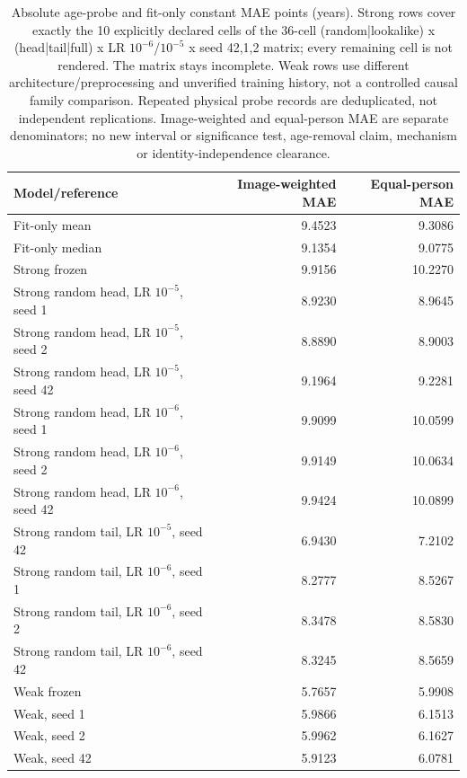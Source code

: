 \begin{table}[!t]
\caption{Absolute age-probe and fit-only constant MAE points (years). Strong rows cover exactly the 10 explicitly declared cells of the 36-cell (random|lookalike) x (head|tail|full) x LR $10^{-6}$/$10^{-5}$ x seed {42,1,2} matrix; every remaining cell is not rendered. The matrix stays incomplete. Weak rows use different architecture/preprocessing and unverified training history, not a controlled causal family comparison. Repeated physical probe records are deduplicated, not independent replications. Image-weighted and equal-person MAE are separate denominators; no new interval or significance test, age-removal claim, mechanism or identity-independence clearance.}
\label{tab:age-probe-absolute-points}
\centering\scriptsize
\begin{tabular}{@{}lrr@{}}
\toprule
Model/reference & Image-weighted MAE & Equal-person MAE \\
\midrule
Fit-only mean & 9.4523 & 9.3086 \\
Fit-only median & 9.1354 & 9.0775 \\
Strong frozen & 9.9156 & 10.2270 \\
Strong random head, LR $10^{-5}$, seed 1 & 8.9230 & 8.9645 \\
Strong random head, LR $10^{-5}$, seed 2 & 8.8890 & 8.9003 \\
Strong random head, LR $10^{-5}$, seed 42 & 9.1964 & 9.2281 \\
Strong random head, LR $10^{-6}$, seed 1 & 9.9099 & 10.0599 \\
Strong random head, LR $10^{-6}$, seed 2 & 9.9149 & 10.0634 \\
Strong random head, LR $10^{-6}$, seed 42 & 9.9424 & 10.0899 \\
Strong random tail, LR $10^{-5}$, seed 42 & 6.9430 & 7.2102 \\
Strong random tail, LR $10^{-6}$, seed 1 & 8.2777 & 8.5267 \\
Strong random tail, LR $10^{-6}$, seed 2 & 8.3478 & 8.5830 \\
Strong random tail, LR $10^{-6}$, seed 42 & 8.3245 & 8.5659 \\
Weak frozen & 5.7657 & 5.9908 \\
Weak, seed 1 & 5.9866 & 6.1513 \\
Weak, seed 2 & 5.9962 & 6.1627 \\
Weak, seed 42 & 5.9123 & 6.0781 \\
\bottomrule
\end{tabular}
\end{table}
